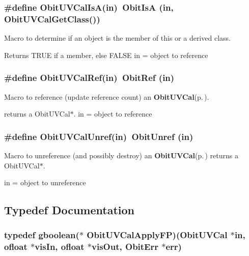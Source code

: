 \subsubsection{\setlength{\rightskip}{0pt plus 5cm}\#define Obit\-UVCal\-Is\-A(in)\ Obit\-Is\-A (in, Obit\-UVCal\-Get\-Class())}\label{ObitUVCal_8h_a2}


Macro to determine if an object is the member of this or a derived class. 

Returns TRUE if a member, else FALSE in = object to reference 
\subsubsection{\setlength{\rightskip}{0pt plus 5cm}\#define Obit\-UVCal\-Ref(in)\ Obit\-Ref (in)}\label{ObitUVCal_8h_a1}


Macro to reference (update reference count) an {\bf Obit\-UVCal}{\rm (p.\,\pageref{structObitUVCal})}. 

returns a Obit\-UVCal$\ast$. in = object to reference 
\subsubsection{\setlength{\rightskip}{0pt plus 5cm}\#define Obit\-UVCal\-Unref(in)\ Obit\-Unref (in)}\label{ObitUVCal_8h_a0}


Macro to unreference (and possibly destroy) an {\bf Obit\-UVCal}{\rm (p.\,\pageref{structObitUVCal})} returns a Obit\-UVCal$\ast$. 

in = object to unreference 

\subsection{Typedef Documentation}
\subsubsection{\setlength{\rightskip}{0pt plus 5cm}typedef gboolean($\ast$ {\bf Obit\-UVCal\-Apply\-FP})({\bf Obit\-UVCal} $\ast$in, {\bf ofloat} $\ast$vis\-In, {\bf ofloat} $\ast$vis\-Out, {\bf Obit\-Err} $\ast$err)}\label{ObitUVCal_8h_a4}


